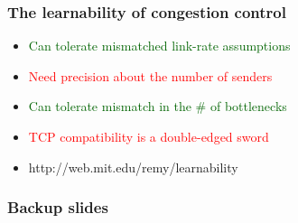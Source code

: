 \documentclass[svgnames]{beamer}
\begin{document}
\begin{Large}
\begin{frame}
\frametitle{The learnability of congestion control}
\noindent
\begin{itemize}
\item<2-> \textcolor{darkgreen}{Can tolerate mismatched link-rate assumptions}
\item<3-> \textcolor{red}{Need precision about the number of senders}
\item<4-> \textcolor{darkgreen}{Can tolerate mismatch in the \# of bottlenecks}
\item<5-> \textcolor{red}{TCP compatibility is a double-edged sword}
\item<6-> http://web.mit.edu/remy/learnability
\end{itemize}
\end{frame}

\end{Large}

\begin{frame}[noframenumbering]
\frametitle{Backup slides}
\end{frame}


\end{document}
